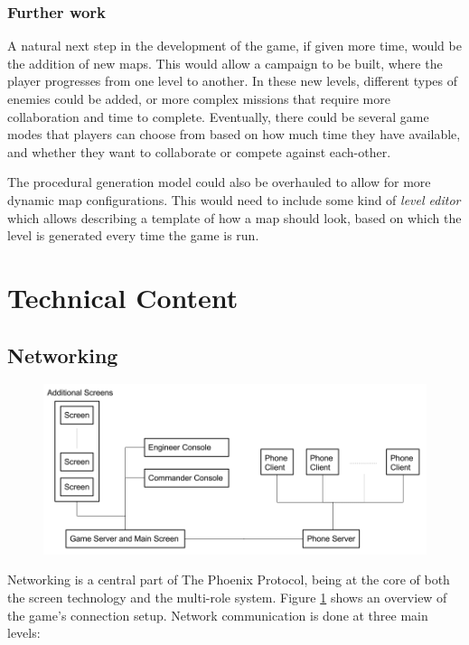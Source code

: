 \documentclass[a4paper,11pt]{article}
\begin{document}
\subsubsection{Further work}

A natural next step in the development of the game, if given more time, would be the addition of new maps. This would allow a campaign to be built, where the player progresses from one level to another. In these new levels, different types of enemies could be added, or more complex missions that require more collaboration and time to complete. Eventually, there could be several game modes that players can choose from based on how much time they have available, and whether they want to collaborate or compete against each-other.

The procedural generation model could also be overhauled to allow for more dynamic map configurations. This would need to include some kind of \emph{level editor} which allows describing a template of how a map should look, based on which the level is generated every time the game is run.

\section{Technical Content}
\subsection{Networking}

\begin{figure}[ht]
	\centering
	\includegraphics[width=\textwidth]{images/network_diagram}
    \label{fig:network_diagram}
\end{figure}

Networking is a central part of The Phoenix Protocol, being at the core of both the screen technology and the multi-role system. Figure \ref{fig:network_diagram} shows an overview of the game's connection setup. Network communication is done at three main levels:
\end{document}
